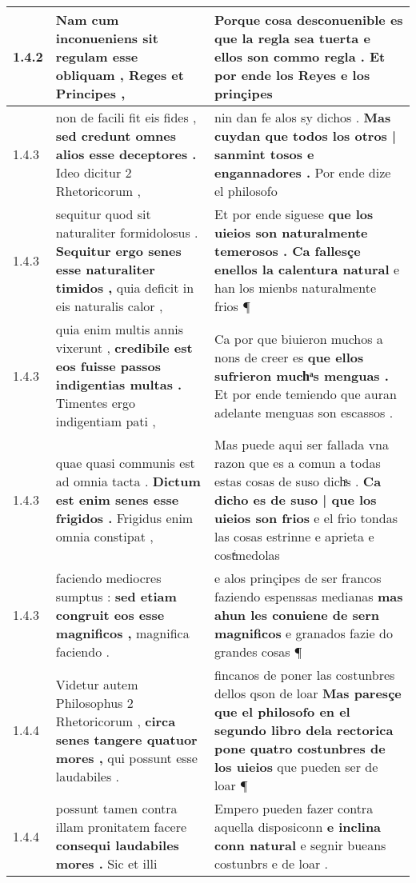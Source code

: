 \begin{tabular}{|p{1cm}|p{6.5cm}|p{6.5cm}|}
1.4.2 & Nam cum inconueniens sit \textbf{ regulam esse obliquam , } Reges et Principes , & Porque cosa desconuenible es que la regla sea tuerta \textbf{ e ellos son commo regla . } Et por ende los Reyes e los prinçipes \\\hline
1.4.3 & non de facili fit eis fides , \textbf{ sed credunt omnes alios esse deceptores . } Ideo dicitur 2 Rhetoricorum , & nin dan fe alos sy dichos . \textbf{ Mas cuydan que todos los otros | sanmint tosos e engannadores . } Por ende dize el philosofo \\\hline
1.4.3 & sequitur quod sit naturaliter formidolosus . \textbf{ Sequitur ergo senes esse naturaliter timidos , } quia deficit in eis naturalis calor , & Et por ende siguese \textbf{ que los uieios son naturalmente temerosos . Ca fallesçe enellos la calentura natural } e han los mienbs naturalmente frios ¶ \\\hline
1.4.3 & quia enim multis annis vixerunt , \textbf{ credibile est eos fuisse passos indigentias multas . } Timentes ergo indigentiam pati , & Ca por que biuieron muchos a nons de creer es \textbf{ que ellos sufrieron muchͣs menguas . } Et por ende temiendo que auran adelante menguas son escassos . \\\hline
1.4.3 & quae quasi communis est ad omnia tacta . \textbf{ Dictum est enim senes esse frigidos . } Frigidus enim omnia constipat , & Mas puede aqui ser fallada vna razon que es a comun a todas estas cosas de suso dichͣs . \textbf{ Ca dicho es de suso | que los uieios son frios } e el frio tondas las cosas estrinne e aprieta e costͥmedolas \\\hline
1.4.3 & faciendo mediocres sumptus : \textbf{ sed etiam congruit eos esse magnificos , } magnifica faciendo . & e alos prinçipes de ser francos faziendo espenssas medianas \textbf{ mas ahun les conuiene de sern magnificos } e granados fazie do grandes cosas ¶ \\\hline
1.4.4 & Videtur autem Philosophus 2 Rhetoricorum , \textbf{ circa senes tangere quatuor mores , } qui possunt esse laudabiles . & fincanos de poner las costunbres dellos qson de loar \textbf{ Mas paresçe que el philosofo en el segundo libro dela rectorica pone quatro costunbres de los uieios } que pueden ser de loar ¶ \\\hline
1.4.4 & possunt tamen contra illam pronitatem facere \textbf{ consequi laudabiles mores . } Sic et illi & Empero pueden fazer contra aquella disposiconn \textbf{ e inclina conn natural } e segnir bueans costunbrs e de loar . \\\hline

\end{tabular}
